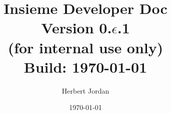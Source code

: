 \documentclass[11pt]{scrreprt}
\title{Insieme Developer Doc \\ Version 0.$\epsilon$.1 \\ (for internal use
only)\\
\vspace{2cm}\Large{Build: \today}}
\author{Herbert Jordan}
\author{}
\date{\today}
\date{}
\begin{document}
 
\maketitle
\small
\tableofcontents
\newpage

\normalsize
\onehalfspacing









\printindex




%
%

\end{document}
